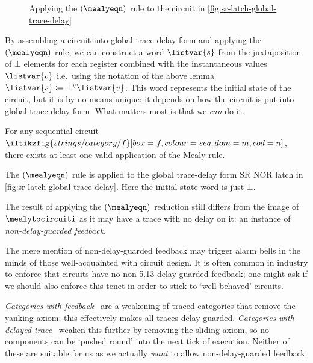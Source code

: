 \documentclass{lmcs}
\begin{document}
\begin{figure}
    \centering
    \caption{
        Applying the \((\mealyeqn)\) rule to the circuit in
        \autoref{fig:sr-latch-global-trace-delay}
    }
    \label{fig:sr-latch-pre-mealy}
\end{figure}

By assembling a circuit into global trace-delay form and
applying the \((\mealyeqn)\) rule, we can construct a word \(\listvar{s}\)
from the juxtaposition of \(\bot\) elements for each register combined with
the instantaneous values \(\listvar{v}\) i.e.\ using the notation of the above
lemma \(\listvar{s} \coloneqq \bot^y\listvar{v}\).
This word represents the initial state of the circuit, but it is by no means
unique: it depends on how the circuit is put into global trace-delay form.
What matters most is that we \emph{can} do it.

\begin{cor}
    For any sequential circuit \(
    \iltikzfig{strings/category/f}[box=f, colour=seq, dom=m, cod=n]
    \), there exists at least one valid application of the Mealy rule.
\end{cor}

\begin{exa}
    The \((\mealyeqn)\) rule is applied to the global trace-delay form
    SR NOR latch in \autoref{fig:sr-latch-global-trace-delay}.
    Here the initial state word is just \(\bot\).
\end{exa}

The result of applying the \((\mealyeqn)\) reduction still differs from the
image of \(\mealytocircuiti\) as it may have a trace with no delay on it: an
instance of \emph{non-delay-guarded feedback}.

The mere mention of non-delay-guarded feedback may trigger alarm bells in
the minds of those well-acquainted with circuit design.
It is often common in industry to enforce that circuits have no
non 5.13-delay-guarded feedback; one might ask if we should also enforce this
tenet in order to stick to `well-behaved' circuits.

\begin{rem}
    \emph{Categories with feedback}~\cite{katis2002feedback} are a weakening of
    traced categories that remove the yanking axiom: this effectively makes all
    traces delay-guarded.
    \emph{Categories with delayed trace}~\cite{sprunger2019differentiable}
    weaken this further by removing the sliding axiom, so no components can be
    `pushed round' into the next tick of execution.
    Neither of these are suitable for us as we actually \emph{want} to allow
    non-delay-guarded feedback.
\end{rem}
\end{document}
